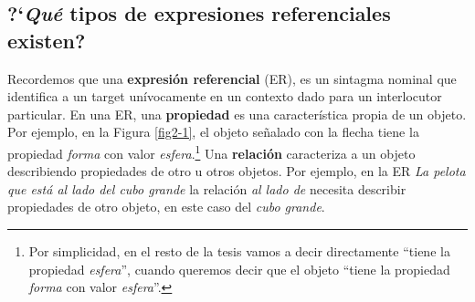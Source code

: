 

\subsection{?`\emph{Qu\'e} tipos de expresiones referenciales existen?}
\label{sec:tipos_er}

Recordemos que una {\bf expresi\'on referencial} (ER), es un sintagma nominal que identifica a un target un\'ivocamente en un contexto dado para un interlocutor particular. En una ER, una \textbf{propiedad} es una caracter\'istica propia de un objeto. Por ejemplo, en la Figura \ref{fig2-1}, el objeto se\~nalado con la flecha tiene la propiedad {\it forma} con valor {\it esfera}.\footnote{Por simplicidad, en el resto de la tesis vamos a decir directamente ``tiene la propiedad {\it esfera}'', cuando queremos decir que el objeto ``tiene la propiedad \emph{forma} con valor \emph{esfera}''.} Una \textbf{relaci\'on} caracteriza a un objeto describiendo propiedades de otro u otros objetos. Por ejemplo, en la ER {\it La pelota que est\'a al lado del cubo grande} la relaci\'on \emph{al lado de} necesita describir propiedades de otro objeto, en este caso del {\it cubo grande}.
\medskip
